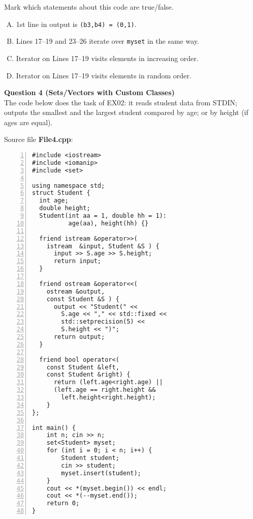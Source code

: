 \documentclass[11pt]{article}
\begin{document}
Mark which statements about this code are true/false.

\begin{enumerate}[(A)]
\item 1st line in output is {\tt (b3,b4) = (0,1)}.
\item Lines 17--19 and 23--26 iterate over {\tt myset} in the same way. 
\item Iterator on Lines 17--19 visits elements in increasing order.
\item Iterator on Lines 17--19 visits elements in random order.
\end{enumerate}


\newpage

\mbox{}
\newpage
\vspace{20pt}
{\bf Question 4 (Sets/Vectors with Custom Classes)}\\
The code below does the task of EX02: it reads student data from STDIN;
outputs the smallest and the largest student compared by age; 
or by height (if ages are equal). 


\vspace{10pt}
Source file {\bf File4.cpp}:
{\footnotesize
\begin{center}
\begin{minipage}{.85\columnwidth}
\begin{Verbatim}[frame=single,numbers=left]
#include <iostream>
#include <iomanip> 
#include <set>

using namespace std;
struct Student {
  int age;
  double height;
  Student(int aa = 1, double hh = 1): 
          age(aa), height(hh) {}

  friend istream &operator>>(
    istream  &input, Student &S ) { 
      input >> S.age >> S.height;
      return input;            
  }

  friend ostream &operator<<( 
    ostream &output, 
	const Student &S ) { 
      output << "Student(" << 
        S.age << "," << std::fixed << 
        std::setprecision(5) << 
		S.height << ")";
      return output;            
  }

  friend bool operator<(
    const Student &left, 
    const Student &right) {
      return (left.age<right.age) || 
      (left.age == right.height && 
        left.height<right.height);
    }
};

int main() {
    int n; cin >> n;
    set<Student> myset;
    for (int i = 0; i < n; i++) {
        Student student; 
        cin >> student;
        myset.insert(student);
    }
    cout << *(myset.begin()) << endl;
    cout << *(--myset.end());
    return 0;
}
\end{Verbatim}
\end{minipage}
\end{center}
}
\end{document}
